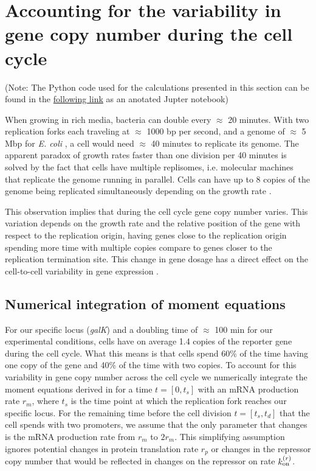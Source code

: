\section{Accounting for the variability in gene copy number during the cell
cycle} \label{supp_multi_gene}

(Note: The Python code used for the calculations presented in this section can
be found in the
\href{https://www.rpgroup.caltech.edu/chann_cap/src/theory/html/moment_dynamics_cell_division.html}{following
link} as an anotated Jupter notebook)

When growing in rich media, bacteria can double every $\approx$ 20 minutes. With
two replication forks each traveling at $\approx$ 1000 bp per second, and a
genome of $\approx$ 5 Mbp for {\it E. coli} \cite{Moran2010}, a cell would need
$\approx$ 40 minutes to replicate its genome. The apparent paradox  of growth
rates faster than one division per 40 minutes is solved by the fact that cells
have multiple replisomes, i.e. molecular machines that replicate the genome
running in parallel. Cells can have up to 8 copies of the genome being
replicated simultaneously depending on the growth rate \cite{Bremer1996}.

This observation implies that during the cell cycle gene copy number varies.
This variation depends on the growth rate and the relative position of the gene
with respect to the replication origin, having genes close to the replication
origin spending more time with multiple copies compare to genes closer to the
replication termination site. This change in gene dosage has a direct effect on
the cell-to-cell variability in gene expression \cite{Jones2014a, Peterson2015}.

\subsection{Numerical integration of moment equations}

For our specific locus ({\it galK}) and a doubling time of $\approx$ 100 min for
our experimental conditions, cells have on average 1.4 copies of the reporter
gene during the cell cycle. What this means is that cells spend 60\% of the time
having one copy of the gene and 40\% of the time with two copies. To account for
this variability in gene copy number across the cell cycle we numerically
integrate the moment equations derived in  for a time $t =
[0, t_s]$ with an mRNA production rate $r_m$, where $t_s$ is the time point at
which the replication fork reaches our specific locus. For the remaining time
before the cell division $t = [t_s, t_d]$ that the cell spends with two
promoters, we assume that the only parameter that changes is the mRNA production
rate from $r_m$ to $2 r_m$. This simplifying assumption ignores potential
changes in protein translation rate $r_p$ or changes in the repressor copy
number that would be reflected in changes on the repressor on rate $k^{(r)}_{\text{on}}$.

